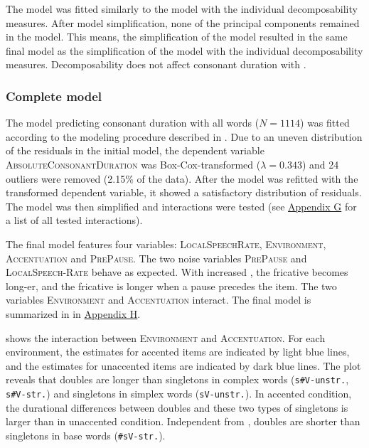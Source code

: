 The model was fitted similarly to the model with the individual decomposability measures. After model simplification, none of the principal components remained in the model. This means, the simplification of the model resulted in the same final model as the simplification of the model with the individual decomposability measures. Decomposability does not affect consonant duration with .


\subsubsection{Complete model}

The model predicting consonant duration with all words ($N=1114$) was fitted according to the modeling procedure described in . Due to an uneven distribution of the residuals in the initial model, the dependent variable \textsc{AbsoluteConsonantDuration} was Box-Cox-transformed ($\lambda = 0.343$) and 24 outliers were removed (2.15\% of the data). After the model was refitted with the transformed dependent variable, it showed a satisfactory distribution of residuals.  The model was then simplified and interactions were tested (see \hyperref[Appendix G Summaries of tested interactions in experimental study]{Appendix G} for a list of all tested interactions). 

The final model features four variables: \textsc{LocalSpeechRate}, \textsc{Environment}, \textsc{Accentuation} and \textsc{PrePause}. The two noise variables \textsc{PrePause} and \textsc{LocalSpeech-Rate} behave as expected. With increased , the fricative becomes long-er, and the fricative is longer when a pause precedes the item.
 The two variables \textsc{Environment} and \textsc{Accentuation} interact. The final model is summarized in  in \hyperref[Appendix H: Model Summaries Experiment]{Appendix H}.




 shows the interaction between \textsc{Environment} and \textsc{Accentuation}. For each environment, the estimates for accented items are indicated by light blue lines, and the estimates for unaccented items are indicated by dark blue lines.
The plot reveals that doubles are longer than singletons in complex words (\texttt{s\#V-unstr.}, \texttt{s\#V-str.}) and singletons in simplex words (\texttt{sV-unstr.}). In accented condition, the durational differences between doubles and these two types of singletons is larger than in unaccented condition. 
Independent from , doubles are shorter than singletons in base words (\texttt{\#sV-str.}).


